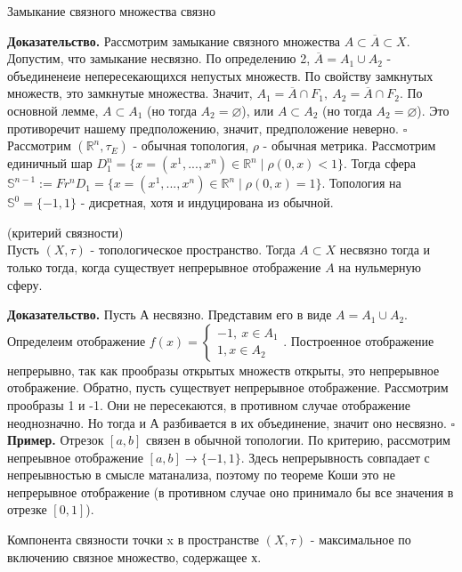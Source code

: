 \begin{theor}
Замыкание связного множества связно
\end{theor}
\textbf{Доказательство.}  Рассмотрим замыкание связного множества $A\subset 
\overline{A}\subset X$. Допустим, что замыкание несвязно. По определению 2,
$\overline{A}=A_1\cup A_2$ - объединенеие непересекающихся непустых множеств.
По свойству замкнутых множеств, это замкнутые множества. 
Значит, $A_1=\overline{A}\cap F_1,~A_2=\overline{A}\cap F_2$. 
По основной лемме, $A\subset A_1$ (но тогда $A_2=\varnothing $),
или $A\subset A_2$ (но тогда $A_2=\varnothing $).  Это противоречит нашему
предположению, значит, предположение неверно. 
$\square$ \\
Рассмотрим $(\mathbb{R}^n,\tau_E)$ - обычная топология, $\rho$ - обычная 
метрика. Рассмотрим единичный шар $D^n_1=\{x=(x^1,...,x^n)\in \mathbb{R}^n\mid
\rho(0,x)<1 \}$. Тогда сфера
$\mathbb{S}^{n-1}:=Fr^nD_1=\{x=(x^1,...,x^n)\in \mathbb{R}^n\mid\rho(0,x)=1\}$.
Топология на $\mathbb{S}^0=\{-1,1\}$ - дисретная, хотя и индуцирована из 
обычной. 
\begin{theor} (критерий связности)\\
Пусть $(X,\tau)$ - топологическое пространство. Тогда  $A\subset X$ несвязно
тогда и только тогда, когда существует непрерывное отображение $A$ на 
нульмерную сферу.
\end{theor}
\textbf{Доказательство.}  Пусть А несвязно. Представим его в виде $A=A_1\cup
A_2$. Определеим отображение  $f(x)=\begin{cases}
    -1,~x\in A_1\\1,x\in A_2\end{cases}$. Построенное отображение 
непрерывно, так как прообразы открытых множеств открыты, это непрерывное
отображение.
Обратно, пусть существует непрерывное отображение. Рассмотрим прообразы 
1 и -1. Они не пересекаются, в противном случае отображение неоднозначно.
Но тогда и А разбивается в их объединение, значит оно несвязно. 
$\square$ \\
\textbf{Пример.} Отрезок $[a,b]$ связен в обычной топологии. По критерию,
рассмотрим непреывное отображение $[a,b]\to \{-1,1\}$. Здесь непрерывность
совпадает с непреывностью в смысле матанализа, поэтому по теореме Коши это
не непрерывное отображение (в противном случае оно принимало бы все значения 
в отрезке $[0,1]$).
\begin{defin}
Компонента связности точки x в пространстве $(X,\tau)$ - максимальное 
по включению связное множество, содержащее х.
\end{defin}
